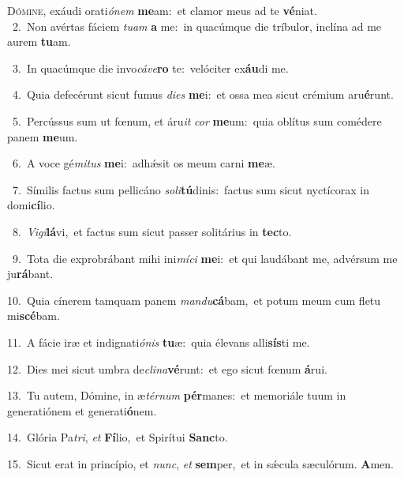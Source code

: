 \lettrine{\initial\textcolor{\initialcolor}{D}}{ómine,} exáudi orati\-\textit{ó}\-\textit{nem} \textbf{me}\-am:~\star et clamor meus ad te \textbf{vé}\-niat.\\
{\numbfont\textcolor{\numbcolor}{~2.}}~Non avértas fáciem \textit{tu}\-\textit{am} \textbf{a} me:~\star in quacúmque die tríbulor, inclína ad me aurem \textbf{tu}\-am.\par
{\numbfont\textcolor{\numbcolor}{~3.}}~In quacúmque die invo\-\textit{cá}\-\textit{ve}\textbf{ro} te:~\star velóciter ex\-\textbf{áu}\-di me.\par
{\numbfont\textcolor{\numbcolor}{~4.}}~Quia defecérunt sicut fumus \textit{di}\-\textit{es} \textbf{me}\-i:~\star et ossa mea sicut crémium aru\-\textbf{é}\-runt.\par
{\numbfont\textcolor{\numbcolor}{~5.}}~Percússus sum ut fœnum, et áru\textit{it} \textit{cor} \textbf{me}\-um:~\star quia oblítus sum comédere panem \textbf{me}\-um.\par
{\numbfont\textcolor{\numbcolor}{~6.}}~A voce gé\-\textit{mi}\-\textit{tus} \textbf{me}\-i:~\star adhǽsit os meum carni \textbf{me}\-æ.\par
{\numbfont\textcolor{\numbcolor}{~7.}}~Símilis factus sum pellicáno \textit{so}\-\textit{li}\textbf{tú}dinis:~\star factus sum sicut nyctícorax in domi\-\textbf{cí}\-lio.\par
{\numbfont\textcolor{\numbcolor}{~8.}}~\-\textit{Vi}\-\textit{gi}\textbf{lá}vi,~\star et factus sum sicut passer solitárius in \textbf{tec}\-to.\par
{\numbfont\textcolor{\numbcolor}{~9.}}~Tota die exprobrábant mihi ini\-\textit{mí}\-\textit{ci} \textbf{me}\-i:~\star et qui laudábant me, advérsum me ju\-\textbf{rá}\-bant.\par
{\numbfont\textcolor{\numbcolor}{10.}}~Quia cínerem tamquam panem \textit{man}\-\textit{du}\textbf{cá}bam,~\star et potum meum cum fletu mi\-\textbf{scé}\-bam.\par
{\numbfont\textcolor{\numbcolor}{11.}}~A fácie iræ et indignati\-\textit{ó}\-\textit{nis} \textbf{tu}\-æ:~\star quia élevans alli\-\textbf{sís}\-ti me.\par
{\numbfont\textcolor{\numbcolor}{12.}}~Dies mei sicut umbra de\-\textit{cli}\-\textit{na}\textbf{vé}runt:~\star et ego sicut fœnum \textbf{á}\-rui.\par
{\numbfont\textcolor{\numbcolor}{13.}}~Tu autem, Dómine, in æ\-\textit{tér}\-\textit{num} \textbf{pér}\-manes:~\star et memoriále tuum in generatiónem et generati\-\textbf{ó}\-nem.\par
{\numbfont\textcolor{\numbcolor}{14.}}~Glória Pa\-\textit{tri}\-, \textit{et} \textbf{Fí}\-lio,~\star et Spirítui \textbf{Sanc}\-to.\par
{\numbfont\textcolor{\numbcolor}{15.}}~Sicut erat in princípio, et \textit{nunc}\-, \textit{et} \textbf{sem}\-per,~\star et in sǽcula sæculórum. \textbf{A}\-men.\par
